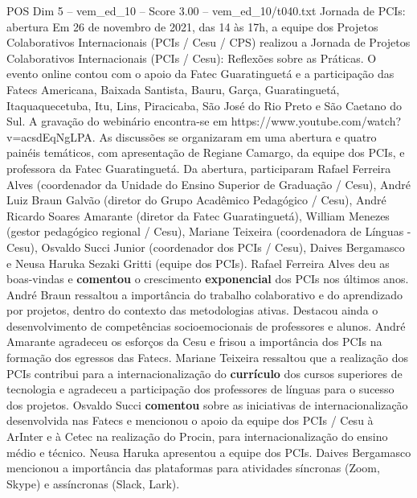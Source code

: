 \begin{textsample}{POS Dim 5 – vem\_ed\_10 – Score 3.00 – vem\_ed\_10/t040.txt}  \label{ex:f5_pos_126}
Jornada de PCIs: abertura Em 26 de novembro de 2021, das 14 às 17h, a equipe dos Projetos Colaborativos Internacionais (PCIs / Cesu / CPS) realizou a Jornada de Projetos Colaborativos Internacionais (PCIs / Cesu): Reflexões sobre as Práticas.
O evento online contou com o apoio da Fatec Guaratinguetá e a participação das Fatecs Americana, Baixada Santista, Bauru, Garça, Guaratinguetá, Itaquaquecetuba, Itu, Lins, Piracicaba, São José do Rio Preto e São Caetano do Sul.
A gravação do webinário encontra-se em https://www.youtube.com/watch?v=acsdEqNgLPA.
As discussões se organizaram em uma abertura e quatro painéis temáticos, com apresentação de Regiane Camargo, da equipe dos PCIs, e professora da Fatec Guaratinguetá.
Da abertura, participaram Rafael Ferreira Alves (coordenador da Unidade do Ensino Superior de Graduação / Cesu), André Luiz Braun Galvão (diretor do Grupo Acadêmico Pedagógico / Cesu), André Ricardo Soares Amarante (diretor da Fatec Guaratinguetá), William Menezes (gestor pedagógico regional / Cesu), Mariane Teixeira (coordenadora de Línguas - Cesu), Osvaldo Succi Junior (coordenador dos PCIs / Cesu), Daives Bergamasco e Neusa Haruka Sezaki Gritti (equipe dos PCIs).
Rafael Ferreira Alves deu as boas-vindas e \textbf{comentou} o crescimento \textbf{exponencial} dos PCIs nos últimos anos.
André Braun ressaltou a importância do trabalho colaborativo e do aprendizado por projetos, dentro do contexto das metodologias ativas.
Destacou ainda o desenvolvimento de competências socioemocionais de professores e alunos.
André Amarante agradeceu os esforços da Cesu e frisou a importância dos PCIs na formação dos egressos das Fatecs.
Mariane Teixeira ressaltou que a realização dos PCIs contribui para a internacionalização do \textbf{currículo} dos cursos superiores de tecnologia e agradeceu a participação dos professores de línguas para o sucesso dos projetos.
Osvaldo Succi \textbf{comentou} sobre as iniciativas de internacionalização desenvolvida nas Fatecs e mencionou o apoio da equipe dos PCIs / Cesu à ArInter e à Cetec na realização do Procin, para internacionalização do ensino médio e técnico.
Neusa Haruka apresentou a equipe dos PCIs.
Daives Bergamasco mencionou a importância das plataformas para atividades síncronas (Zoom, Skype) e assíncronas (Slack, Lark).

\end{textsample}
